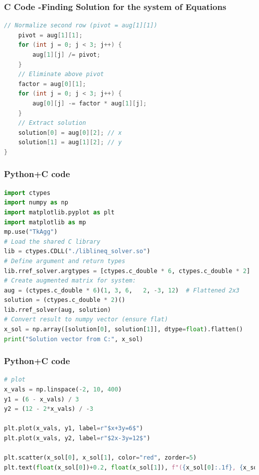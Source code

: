 \documentclass{beamer}
\begin{document}
\begin{frame}[fragile]
    \frametitle{C Code -Finding Solution for the system of Equations}

    \begin{lstlisting}[language=C]
    // Normalize second row (pivot = aug[1][1])
    pivot = aug[1][1];
    for (int j = 0; j < 3; j++) {
        aug[1][j] /= pivot;
    }
    // Eliminate above pivot
    factor = aug[0][1];
    for (int j = 0; j < 3; j++) {
        aug[0][j] -= factor * aug[1][j];
    }
    // Extract solution
    solution[0] = aug[0][2]; // x
    solution[1] = aug[1][2]; // y
}


    \end{lstlisting}
\end{frame}

\begin{frame}[fragile]
    \frametitle{Python+C code}

    \begin{lstlisting}[language=Python]
import ctypes
import numpy as np
import matplotlib.pyplot as plt
import matplotlib as mp
mp.use("TkAgg")
# Load the shared C library
lib = ctypes.CDLL("./liblineq_solver.so")
# Define argument and return types
lib.rref_solver.argtypes = [ctypes.c_double * 6, ctypes.c_double * 2]
# Create augmented matrix for system:
aug = (ctypes.c_double * 6)(1, 3, 6,   2, -3, 12)  # Flattened 2x3
solution = (ctypes.c_double * 2)()
lib.rref_solver(aug, solution)
# Convert result to numpy vector (ensure flat)
x_sol = np.array([solution[0], solution[1]], dtype=float).flatten()
print("Solution vector from C:", x_sol)


    \end{lstlisting}
\end{frame}

\begin{frame}[fragile]
    \frametitle{Python+C code}

    \begin{lstlisting}[language=Python]
# plot
x_vals = np.linspace(-2, 10, 400)
y1 = (6 - x_vals) / 3
y2 = (12 - 2*x_vals) / -3

plt.plot(x_vals, y1, label=r"$x+3y=6$")
plt.plot(x_vals, y2, label=r"$2x-3y=12$")

plt.scatter(x_sol[0], x_sol[1], color="red", zorder=5)
plt.text(float(x_sol[0])+0.2, float(x_sol[1]), f"({x_sol[0]:.1f}, {x_sol[1]:.1f})", color="red")


    \end{lstlisting}
\end{frame}
\end{document}
